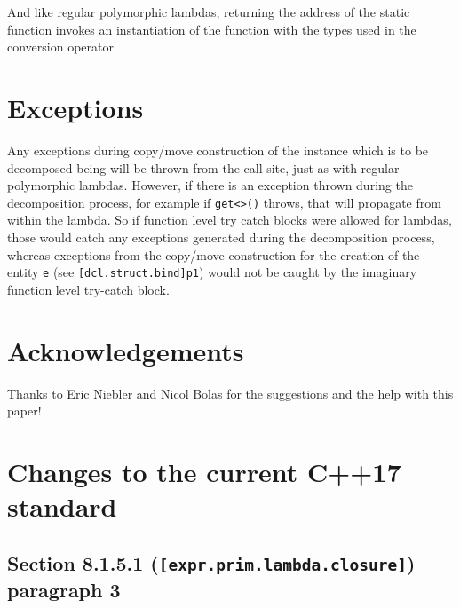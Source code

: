 \documentclass{article}
\begin{document}
And like regular polymorphic lambdas, returning the address of the static
function invokes an instantiation of the function with the types used in the
conversion operator

\section{Exceptions}
Any exceptions during copy/move construction of the instance which is to be
decomposed being will be thrown from the call site, just as with regular
polymorphic lambdas.  However, if there is an exception thrown during the
decomposition process, for example if \texttt{get<>()} throws, that will
propagate from within the lambda.  So if function level try catch blocks were
allowed for lambdas, those would catch any exceptions generated during the
decomposition process, whereas exceptions from the copy/move construction for
the creation of the entity \texttt{e} (see \texttt{[dcl.struct.bind]p1}) would
not be caught by the imaginary function level try-catch block.


\section{Acknowledgements}

Thanks to Eric Niebler and Nicol Bolas for the suggestions and the help with
this paper!


\section{Changes to the current C++17 standard}
\subsection{Section 8.1.5.1 (\texttt{[expr.prim.lambda.closure]}) paragraph 3}
\end{document}
